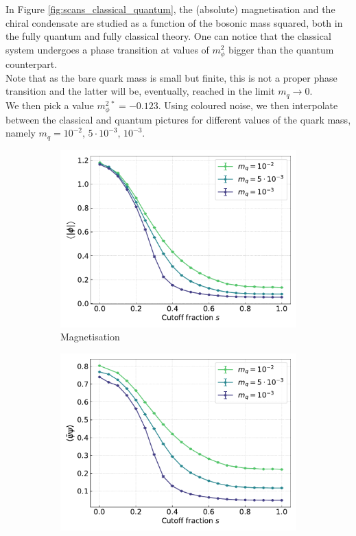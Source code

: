 In Figure \ref{fig:scans_classical_quantum}, the (absolute) magnetisation and the chiral condensate are studied as a function of the bosonic mass squared, both in the fully quantum and fully classical theory. One can notice that the classical system undergoes a phase transition at values of $m_\phi^2$ bigger than the quantum counterpart. \\
Note that as the bare quark mass is small but finite, this is not a proper phase transition and the latter will be, eventually, reached in the limit $m_q \to 0$. \\
We then pick a value $m_\phi^{2 \, *} = -0.123$. Using coloured noise, we then interpolate between the classical and quantum pictures for different values of the quark mass, namely $m_q = 10^{-2}, \, 5 \cdot 10^{-3}, \, 10^{-3}$.
\begin{figure}[h!]
\centering
\begin{subfigure}{0.47\textwidth}	
	\includegraphics[width=\textwidth]{figures/chiral_PT/magnetisation.pdf}
    \caption{Magnetisation}
\end{subfigure}
\begin{subfigure}{0.47\textwidth}	
	\includegraphics[width=\textwidth]{figures/chiral_PT/condensate.pdf}

\end{subfigure}
\end{figure}

